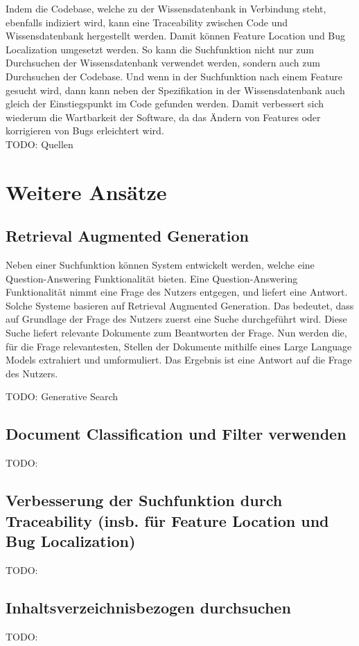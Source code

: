 Indem die Codebase, welche zu der Wissensdatenbank in Verbindung steht, ebenfalls indiziert wird, kann eine Traceability zwischen Code und Wissensdatenbank hergestellt werden.
Damit können Feature Location und Bug Localization umgesetzt werden.
So kann die Suchfunktion nicht nur zum Durchsuchen der Wissensdatenbank verwendet werden, sondern auch zum Durchsuchen der Codebase.
Und wenn in der Suchfunktion nach einem Feature gesucht wird, dann kann neben der Spezifikation in der Wissensdatenbank auch gleich der Einstiegspunkt im Code gefunden werden.
Damit verbessert sich wiederum die Wartbarkeit der Software, da das Ändern von Features oder korrigieren von Bugs erleichtert wird.\\
TODO: Quellen

\section{Weitere Ansätze}

\subsection{Retrieval Augmented Generation}
Neben einer Suchfunktion können System entwickelt werden, welche eine Question-Answering Funktionalität bieten.
Eine Question-Answering Funktionalität nimmt eine Frage des Nutzers entgegen, und liefert eine Antwort.
Solche Systeme basieren auf Retrieval Augmented Generation.
Das bedeutet, dass auf Grundlage der Frage des Nutzers zuerst eine Suche durchgeführt wird.
Diese Suche liefert relevante Dokumente zum Beantworten der Frage.
Nun werden die, für die Frage relevantesten, Stellen der Dokumente mithilfe eines Large Language Models extrahiert und umformuliert.
Das Ergebnis ist eine Antwort auf die Frage des Nutzers. 

TODO: Generative Search

\subsection{Document Classification und Filter verwenden}
TODO:

\subsection{Verbesserung der Suchfunktion durch Traceability (insb. für Feature Location und Bug Localization)}
TODO:

\subsection{Inhaltsverzeichnisbezogen durchsuchen}
TODO: